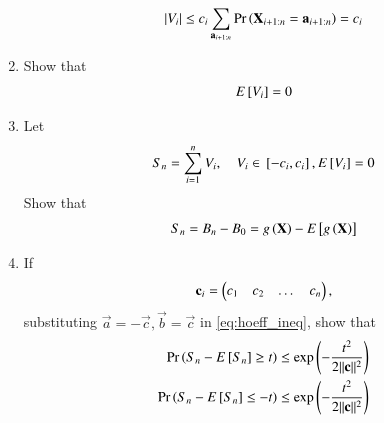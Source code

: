 \documentclass[journal,12pt,twocolumn]{IEEEtran}
\renewcommand\thesection{\arabic{section}}
\begin{document}
\begin{enumerate}[label=\thesection.\arabic*,ref=\thesection.\theenumi]
\begin{align}
\left\vert V_i\right\vert \le c_i \sum_{\mathbf{a}_{i+1:n}}\Pr\left(\mathbf{X}_{i+1:n} = \mathbf{a}_{i+1:n}\right) = c_i
\end{align}
\item Show that 
\begin{align}
 E{}\left[V_i\right]  = 0
\end{align}
\item Let
\begin{align}
S_n=\sum_{i=1}^{n} V_i, \quad V_i \in {}\left[-c_i,c_i\right], E{}\left[V_i\right]  = 0
\end{align}
%
Show that
\begin{align}
S_n = B_n - B_0 = g\left(\mathbf{X}\right)-E{}\left[g\left(\mathbf{X}\right)\right]
\end{align}
\item If 
\begin{align}
\mathbf{c}_i = \begin{pmatrix}c_1 & c_2 & \dots & c_n\end{pmatrix},
\end{align}
substituting $\vec{a} = -\vec{c}, \vec{b} = \vec{c}$ in \eqref{eq:hoeff_ineq}, show that
\begin{align}
\label{eq:mcdiarmid}
\Pr\left(S_n- E{}\left[S_n\right] \ge t\right) &\le \exp\left(-\frac{t^2}{2\lVert\mathbf{c}\rVert^2}\right)
\\
\Pr\left(S_n- E{}\left[S_n\right] \le -t\right) &\le \exp\left(-\frac{t^2}{2\lVert\mathbf{c}\rVert^2}\right)
\end{align}

\end{enumerate}
\end{document}
